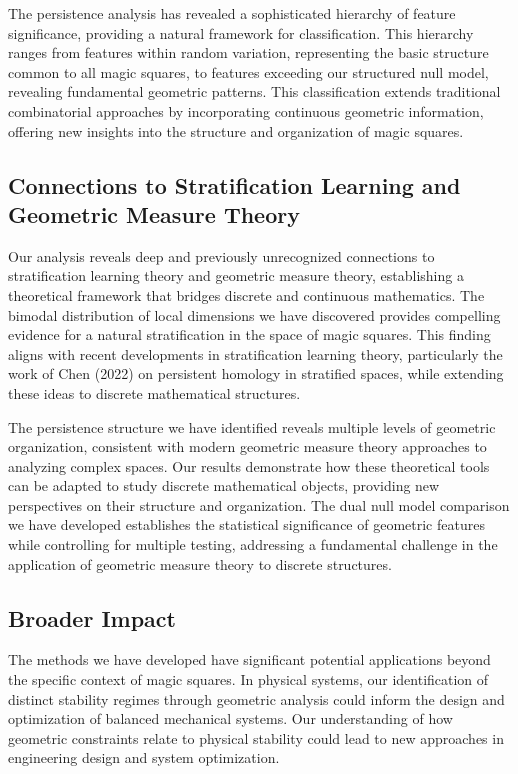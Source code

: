 The persistence analysis has revealed a sophisticated hierarchy of feature significance, providing a natural framework for classification. This hierarchy ranges from features within random variation, representing the basic structure common to all magic squares, to features exceeding our structured null model, revealing fundamental geometric patterns. This classification extends traditional combinatorial approaches by incorporating continuous geometric information, offering new insights into the structure and organization of magic squares.

\subsection{Connections to Stratification Learning and Geometric Measure Theory}
\label{subsec:stratification}

Our analysis reveals deep and previously unrecognized connections to stratification learning theory and geometric measure theory, establishing a theoretical framework that bridges discrete and continuous mathematics. The bimodal distribution of local dimensions we have discovered provides compelling evidence for a natural stratification in the space of magic squares. This finding aligns with recent developments in stratification learning theory, particularly the work of Chen (2022) on persistent homology in stratified spaces, while extending these ideas to discrete mathematical structures.

The persistence structure we have identified reveals multiple levels of geometric organization, consistent with modern geometric measure theory approaches to analyzing complex spaces. Our results demonstrate how these theoretical tools can be adapted to study discrete mathematical objects, providing new perspectives on their structure and organization. The dual null model comparison we have developed establishes the statistical significance of geometric features while controlling for multiple testing, addressing a fundamental challenge in the application of geometric measure theory to discrete structures.

\subsection{Broader Impact}
\label{subsec:impact}

The methods we have developed have significant potential applications beyond the specific context of magic squares. In physical systems, our identification of distinct stability regimes through geometric analysis could inform the design and optimization of balanced mechanical systems. Our understanding of how geometric constraints relate to physical stability could lead to new approaches in engineering design and system optimization.

